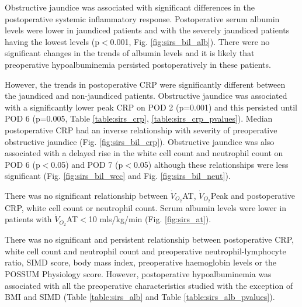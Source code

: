 Obstructive jaundice was associated with significant differences in the postoperative systemic inflammatory response. 
Postoperative serum albumin levels were lower in jaundiced patients and with the severely jaundiced patients having the lowest levels (p$<$0.001, Fig. \ref{fig:sirs_bil_alb}). 
There were no significant changes in the trends of albumin levels and it is likely that preoperative hypoalbuminemia persisted postoperatively in these patients. 

However, the trends in postoperative CRP were significantly different between the jaundiced and non-jaundiced patients. 
Obstructive jaundice was associated with a significantly lower peak CRP on POD 2 (p=0.001) and this persisted until POD 6 (p=0.005, Table \ref{table:sirs_crp}, \ref{table:sirs_crp_pvalues}).
Median postoperative CRP had an inverse relationship with severity of preoperative obstructive jaundice (Fig. \ref{fig:sirs_bil_crp}).
Obstructive jaundice was also associated with a delayed rise in the white cell count and neutrophil count on POD 6 (p$<$0.05) and POD 7 (p$<$0.05) although these relationships were less significant (Fig. \ref{fig:sirs_bil_wcc} and Fig. \ref{fig:sirs_bil_neut}). 

There was no significant relationship between $\dot{V}_{O_2}$AT, $\dot{V}_{O_2}$Peak and postoperative CRP, white cell count or neutrophil count. 
Serum albumin levels were lower in patients with $\dot{V}_{O_2}$AT$<$10 mls/kg/min (Fig. \ref{fig:sirs_at}).

There was no significant and persistent relationship between postoperative CRP, white cell count and neutrophil count and preoperative neutrophil-lymphocyte ratio, SIMD score, body mass index, preoperative haemoglobin levels or the POSSUM Physiology score. 
However, postoperative hypoalbuminemia was associated with all the preoperative characteristics studied with the exception of BMI and SIMD (Table \ref{table:sirs_alb} and Table \ref{table:sirs_alb_pvalues}).









